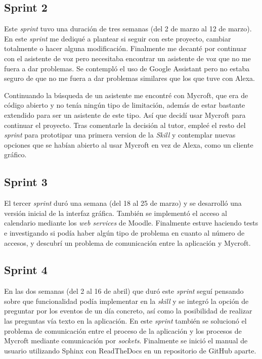 \subsection{Sprint 2}

Este \textit{sprint} tuvo una duración de tres semanas (del 2 de marzo al 12 de marzo). En este \textit{sprint} me dediqué a plantear si seguir con este proyecto, cambiar totalmente o hacer alguna modificación. Finalmente me decanté por continuar con el asistente de voz pero necesitaba encontrar un asistente de voz que no me fuera a dar problemas. Se contempló el uso de Google Assistant pero no estaba seguro de que no me fuera a dar problemas similares que los que tuve con Alexa.

Continuando la búsqueda de un asistente me encontré con Mycroft, que era de código abierto y no tenía ningún tipo de limitación, además de estar bastante extendido para ser un asistente de este tipo. Así que decidí usar Mycroft para continuar el proyecto.
Tras comentarle la decisión al tutor, empleé el resto del \textit{sprint} para prototipar una primera version de la \textit{Skill} y contemplar nuevas opciones que se habían abierto al usar Mycroft en vez de Alexa, como un cliente gráfico.

\subsection{Sprint 3}

El tercer \textit{sprint} duró una semana (del 18 al 25 de marzo) y se desarrolló una versión inicial de la interfaz gráfica. También se implementó el acceso al calendario mediante los \textit{web services} de Moodle. Finalmente estuve haciendo tests e investigando si podía haber algún tipo de problema en cuanto al número de accesos, y descubrí un problema de comunicación entre la aplicación y Mycroft.

\subsection{Sprint 4}

En las dos semanas (del 2 al 16 de abril) que duró este \textit{sprint} seguí pensando sobre que funcionalidad podía implementar en la \textit{skill} y se integró la opción de preguntar por los eventos de un día concreto, así como la posibilidad de realizar las preguntas vía texto en la aplicación. En este \textit{sprint} también se solucionó el problema de comunicación entre el proceso de la aplicación y los procesos de Mycroft mediante comunicación por \textit{sockets}. Finalmente se inició el manual de usuario utilizando Sphinx con ReadTheDocs en un repositorio de GitHub aparte.

